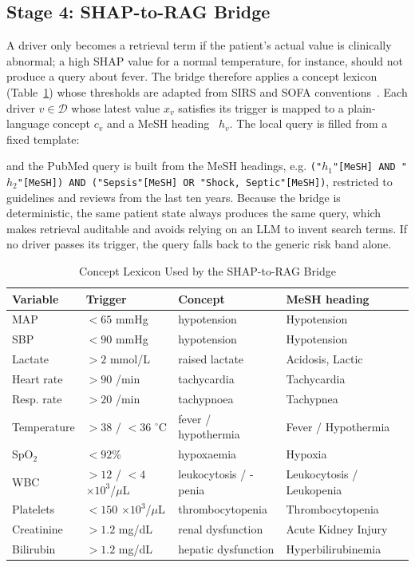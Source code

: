\documentclass[conference]{IEEEtran}
\begin{document}
\subsection{Stage 4: SHAP-to-RAG Bridge}
A driver only becomes a retrieval term if the patient's actual value is
clinically abnormal; a high SHAP value for a normal temperature, for
instance, should not produce a query about fever. The bridge therefore
applies a concept lexicon (Table~\ref{tab:lexicon}) whose thresholds are
adapted from SIRS and SOFA conventions~\cite{singer2016sepsis3}. Each
driver $v \in \mathcal{D}$ whose latest value $x_v$ satisfies its trigger
is mapped to a plain-language concept $c_v$ and a MeSH
heading~\cite{lipscomb2000mesh} $h_v$. The local query is filled from a
fixed template:

\vspace{2pt}
\noindent{}
\vspace{2pt}

\noindent and the PubMed query is built from the MeSH headings, e.g.
\texttt{("$h_1$"[MeSH] AND "$h_2$"[MeSH]) AND ("Sepsis"[MeSH] OR "Shock,
Septic"[MeSH])}, restricted to guidelines and reviews from the last ten
years. Because the bridge is deterministic, the same patient state always
produces the same query, which makes retrieval auditable and avoids
relying on an LLM to invent search terms. If no driver passes its trigger,
the query falls back to the generic risk band alone.

\begin{table}[!t]
\caption{Concept Lexicon Used by the SHAP-to-RAG Bridge}
\label{tab:lexicon}
\centering
\footnotesize
\setlength{\tabcolsep}{3pt}
\begin{tabular}{@{}llll@{}}
\toprule
Variable & Trigger & Concept & MeSH heading \\
\midrule
MAP & $<65$ mmHg & hypotension & Hypotension \\
SBP & $<90$ mmHg & hypotension & Hypotension \\
Lactate & $>2$ mmol/L & raised lactate & Acidosis, Lactic \\
Heart rate & $>90$ /min & tachycardia & Tachycardia \\
Resp. rate & $>20$ /min & tachypnoea & Tachypnea \\
Temperature & $>38$ / $<36$ $^\circ$C & fever / hypothermia & Fever / Hypothermia \\
SpO$_2$ & $<92$\% & hypoxaemia & Hypoxia \\
WBC & $>12$ / $<4$ $\times10^3$/$\mu$L & leukocytosis / -penia & Leukocytosis / Leukopenia \\
Platelets & $<150$ $\times10^3$/$\mu$L & thrombocytopenia & Thrombocytopenia \\
Creatinine & $>1.2$ mg/dL & renal dysfunction & Acute Kidney Injury \\
Bilirubin & $>1.2$ mg/dL & hepatic dysfunction & Hyperbilirubinemia \\
\bottomrule
\end{tabular}
\end{table}
\end{document}
